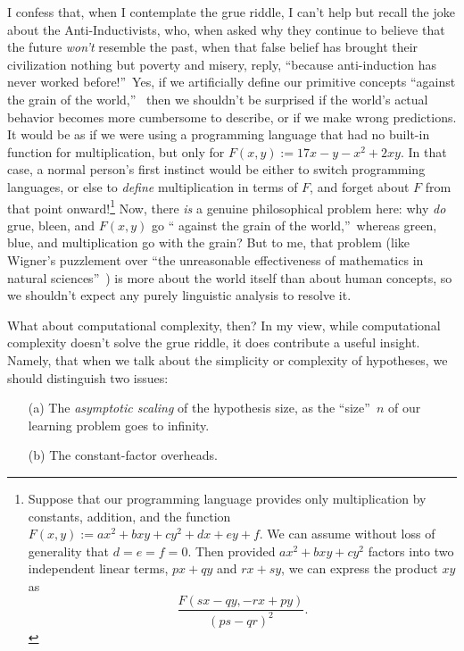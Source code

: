 \documentclass[12pt,onecolumn]{article}%
\begin{document}
I confess that, when I contemplate the grue riddle, I can't help but recall
the joke about the Anti-Inductivists, who, when asked why they continue to
believe that the future \textit{won't} resemble the past, when that false
belief has brought their civilization nothing but poverty and misery, reply,
\textquotedblleft because anti-induction has never worked
before!\textquotedblright\  Yes, if we artificially define our primitive
concepts \textquotedblleft against the grain of the world,\textquotedblright\ %
 then we shouldn't be surprised if the world's actual behavior becomes more
cumbersome to describe, or if we make wrong predictions. It would be as if
we were using a programming language that had no built-in function for
multiplication, but only for $F(  x,y)  :=17x-y-x^{2}+2xy$. In
that case, a normal person's first instinct would be either to switch
programming languages, or else to \textit{define} multiplication in terms of
$F$, and forget about $F$ from that point onward!\footnote{Suppose that our
programming language provides only multiplication by constants, addition, and
the function $F(  x,y)  :=ax^{2}+bxy+cy^{2}+dx+ey+f$. We can
assume without loss of generality that $d=e=f=0$. Then provided
$ax^{2}+bxy+cy^{2}$ factors into two independent linear terms, $px+qy$ and
$rx+sy$, we can express the product $xy$ as%
\[
\frac{F(  sx-qy,-rx+py)  }{\left(  ps-qr\right)  ^{2}}.
\]
} Now, there \textit{is} a genuine philosophical problem here: why
\textit{do} grue, bleen, and $F(  x,y)  $ go \textquotedblleft
against the grain of the world,\textquotedblright\  whereas green, blue, and
multiplication go with the grain? But to me, that problem (like Wigner's
puzzlement over \textquotedblleft the unreasonable effectiveness of
mathematics in natural sciences\textquotedblright\  \cite{wigner}) is more
about the world itself than about human concepts, so we shouldn't expect any
purely linguistic analysis to resolve it.

What about computational complexity, then? In my view, while computational
complexity doesn't solve the grue riddle, it does contribute a useful insight.
 Namely, that when we talk about the simplicity or complexity of hypotheses,
we should distinguish two issues:

\begin{enumerate}
\item[(a)] The \textit{asymptotic scaling} of the hypothesis size, as the
\textquotedblleft size\textquotedblright\  $n$ of our learning problem goes to infinity.

\item[(b)] The constant-factor overheads.
\end{enumerate}
\end{document}
